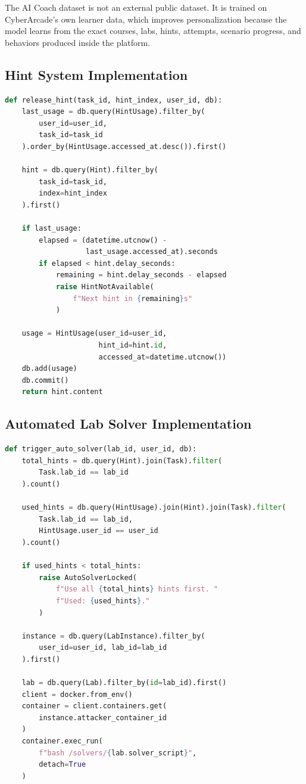 \documentclass[12pt,a4paper]{report}
\begin{document}
The AI Coach dataset is not an external public dataset. It is trained on CyberArcade's own learner data, which improves personalization because the model learns from the exact courses, labs, hints, attempts, scenario progress, and behaviors produced inside the platform.

\subsection{Hint System Implementation}

\begin{lstlisting}[language=Python, caption={Hint Timer Enforcement}]
def release_hint(task_id, hint_index, user_id, db):
    last_usage = db.query(HintUsage).filter_by(
        user_id=user_id,
        task_id=task_id
    ).order_by(HintUsage.accessed_at.desc()).first()

    hint = db.query(Hint).filter_by(
        task_id=task_id,
        index=hint_index
    ).first()

    if last_usage:
        elapsed = (datetime.utcnow() -
                   last_usage.accessed_at).seconds
        if elapsed < hint.delay_seconds:
            remaining = hint.delay_seconds - elapsed
            raise HintNotAvailable(
                f"Next hint in {remaining}s"
            )

    usage = HintUsage(user_id=user_id,
                      hint_id=hint.id,
                      accessed_at=datetime.utcnow())
    db.add(usage)
    db.commit()
    return hint.content
\end{lstlisting}

\subsection{Automated Lab Solver Implementation}

\begin{lstlisting}[language=Python, caption={Auto-Solver Prerequisite Check and Execution}]
def trigger_auto_solver(lab_id, user_id, db):
    total_hints = db.query(Hint).join(Task).filter(
        Task.lab_id == lab_id
    ).count()

    used_hints = db.query(HintUsage).join(Hint).join(Task).filter(
        Task.lab_id == lab_id,
        HintUsage.user_id == user_id
    ).count()

    if used_hints < total_hints:
        raise AutoSolverLocked(
            f"Use all {total_hints} hints first. "
            f"Used: {used_hints}."
        )

    instance = db.query(LabInstance).filter_by(
        user_id=user_id, lab_id=lab_id
    ).first()

    lab = db.query(Lab).filter_by(id=lab_id).first()
    client = docker.from_env()
    container = client.containers.get(
        instance.attacker_container_id
    )
    container.exec_run(
        f"bash /solvers/{lab.solver_script}",
        detach=True
    )
\end{lstlisting}
\end{document}
